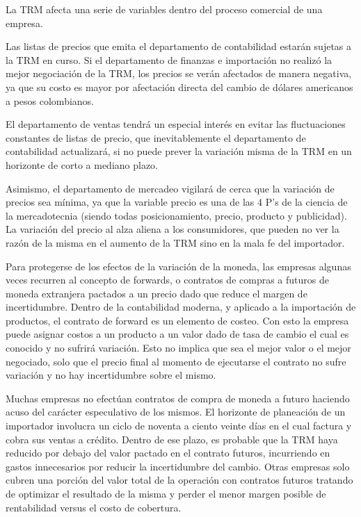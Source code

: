La TRM afecta una serie de variables dentro del proceso comercial de una empresa. 

Las listas de precios que emita el departamento de contabilidad estarán sujetas a la TRM en curso. Si el departamento de finanzas e importación no realizó la mejor negociación de la TRM, los precios se verán afectados de manera negativa, ya que su costo es mayor por afectación directa del cambio de dólares americanos a pesos colombianos.

El departamento de ventas tendrá un especial interés en evitar las fluctuaciones constantes de listas de precio, que inevitablemente el departamento de contabilidad actualizará, si no puede prever la variación misma de la TRM en un horizonte de corto a mediano plazo. 

Asimismo, el departamento de mercadeo vigilará de cerca que la variación de precios sea mínima, ya que la variable precio es una de las 4 P’s de la ciencia de la mercadotecnia (siendo todas posicionamiento, precio, producto y publicidad). La variación del precio al alza aliena a los consumidores, que pueden no ver la razón de la misma en el aumento de la TRM sino en la mala fe del importador. 

Para protegerse de los efectos de la variación de la moneda, las empresas algunas veces recurren al concepto de forwards, o contratos de compras a futuros de moneda extranjera pactados a un precio dado que reduce el margen de incertidumbre. Dentro de la contabilidad moderna, y aplicado a la importación de productos, el contrato de forward es un elemento de costeo. Con esto la empresa puede asignar costos a un producto a un valor dado de tasa de cambio el cual es conocido y no sufrirá variación. Esto no implica que sea el mejor valor o el mejor negociado, solo que el precio final al momento de ejecutarse el contrato no sufre variación y no hay incertidumbre sobre el mismo. 

Muchas empresas no efectúan contratos de compra de moneda a futuro haciendo acuso del carácter especulativo de los mismos. El horizonte de planeación de un importador involucra un ciclo de noventa a ciento veinte días en el cual factura y cobra sus ventas a crédito. Dentro de ese plazo, es probable que la TRM haya reducido por debajo del valor pactado en el contrato futuros, incurriendo en gastos innecesarios por reducir la incertidumbre del cambio. Otras empresas solo cubren una porción del valor total de la operación con contratos futuros tratando de optimizar el resultado de la misma y perder el menor margen posible de rentabilidad versus el costo de cobertura. 

